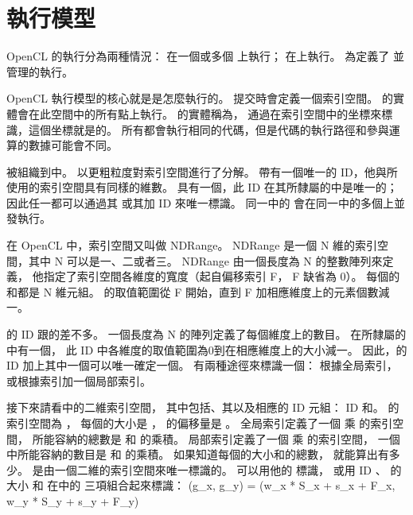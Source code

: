 
\section{執行模型}
OpenCL 的執行分為兩種情況：
在一個或多個 {} 上執行；
在上執行。
為定義了
並管理的執行。

OpenCL 執行模型的核心就是是怎麼執行的。
提交時會定義一個索引空間。
的實體會在此空間中的所有點上執行。
的實體稱為，
通過在索引空間中的坐標來標識，這個坐標就是的。
所有都會執行相同的代碼，但是代碼的執行路徑和參與運算的數據可能會不同。

被組織到中。
以更粗粒度對索引空間進行了分解。
帶有一個唯一的 ID，他與所使用的索引空間具有同樣的維數。
具有一個，此 ID 在其所隸屬的中是唯一的；
因此任一都可以通過其
或其加 ID 來唯一標識。
同一中的
會在同一中的多個上並發執行。

在 OpenCL 中，索引空間又叫做 NDRange。
NDRange 是一個 N 維的索引空間，其中 N 可以是一、二或者三。
NDRange 由一個長度為 N 的整數陣列來定義，
他指定了索引空間各維度的寬度（起自偏移索引 F， F 缺省為 0）。
每個的和都是 N 維元組。
的取值範圍從 F 開始，直到 F 加相應維度上的元素個數減一。

的 ID 跟的差不多。
一個長度為 N 的陣列定義了每個維度上的數目。
在所隸屬的中有一個，
此 ID 中各維度的取值範圍為0到在相應維度上的大小減一。
因此，的 ID 加上其中一個可以唯一確定一個。
有兩種途徑來標識一個：
根據全局索引，或根據索引加一個局部索引。

接下來請看中的二維索引空間，
其中包括、其以及相應的 ID 元組：
 ID 和。
的索引空間為 ，
每個的大小是 ，
的偏移量是 。
全局索引定義了一個  乘  的索引空間，
所能容納的總數是  和  的乘積。
局部索引定義了一個  乘  的索引空間，
一個中所能容納的數目是  和  的乘積。
如果知道每個的大小和的總數，
就能算出有多少。
是由一個二維的索引空間來唯一標識的。
可以用他的  標識，
或用 ID 、
的大小  和
在中的  三項組合起來標識：
\startformula
(g_x, g_y) = (w_x * S_x + s_x + F_x, w_y * S_y + s_y + F_y)
\stopformula

